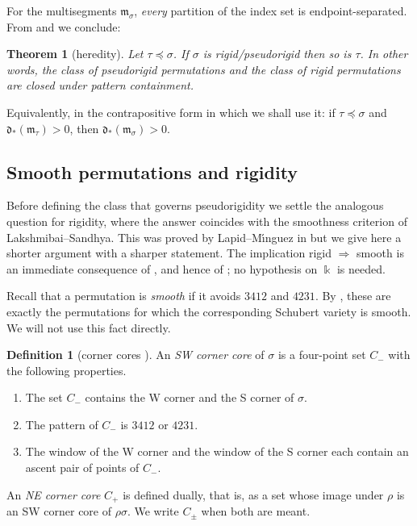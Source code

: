 \documentclass[12pt]{article}
\def\xspace{ }%
\newtheorem{theorem}{Theorem}[section]
\theoremstyle{definition}
\newtheorem{definition}[definition]{Definition}
\newcommand{\prig}{pseudorigid\xspace}
\newcommand{\prigity}{pseudorigidity\xspace}
\newcommand{\smth}{smooth\xspace}
\newcommand{\Smth}{Smooth\xspace}
\newcommand{\mm}{\mathfrak{m}}
\newcommand{\kk}{\Bbbk}
\newcommand{\dfr}{\mathfrak{d}}  %
\newcommand{\rsub}{\sharp}       %
\newcommand{\psub}{\flat}        %
\newcommand{\wo}{w_0}                 %
\newcommand{\rc}{\rho}                %
\newcommand{\Wcr}{W\xspace}    %
\newcommand{\Ncr}{N\xspace}    %
\newcommand{\Scr}{S\xspace}    %
\newcommand{\Ecr}{E\xspace}    %
\newcommand{\SWcr}{SW\xspace}  %
\newcommand{\NEcr}{NE\xspace}  %
\newcommand{\core}{corner core\xspace}
\newcommand{\cores}{corner cores\xspace}
\newcommand{\Cm}{C_{-}}
\newcommand{\Cp}{C_{+}}
\newcommand{\Cpm}{C_{\pm}}
\begin{document}
For the multisegments $\mm_\sigma$, \emph{every} partition of the index set is endpoint-separated.
From  and  we conclude:

\begin{theorem}[heredity]\label{thm:hered}
Let $\tau \preceq \sigma$. If $\sigma$ is rigid/\prig then so is $\tau$.
In other words, the class of \prig permutations and the class of rigid permutations are closed under pattern
containment.
\end{theorem}

Equivalently, in the contrapositive form in which we shall use it: if $\tau
\preceq \sigma$ and $\dfr_\ast(\mm_\tau) > 0$, then
$\dfr_\ast(\mm_\sigma) > 0$.



\subsection{\Smth permutations and rigidity}\label{ssec:smoothrigid}

Before defining the class that governs \prigity we settle the analogous
question for rigidity, where the answer coincides with the smoothness criterion of Lakshmibai--Sandhya.
This was proved by Lapid--M\'{\i}nguez in \cite{MR3866895} but we give here a shorter argument with a sharper statement.
The implication rigid $\Rightarrow$ \smth is an immediate consequence of ,
and hence of ; no hypothesis on $\kk$ is needed.

Recall that a permutation is \emph{\smth} if it avoids $3412$ and $4231$.
By \cite{MR1051089}, these are exactly the permutations for which the corresponding Schubert variety is smooth.
We will not use this fact directly.

\begin{definition}[\cores]\label{def:cores}
An \emph{\SWcr \core} of $\sigma$ is a four-point set $\Cm$ with the
following properties.
\begin{enumerate}
\item\label{core:corners} The set $\Cm$ contains the \Wcr corner and the \Scr
corner of $\sigma$.
\item\label{core:pattern} The pattern of $\Cm$ is $3412$ or $4231$.
\item\label{core:ascent} The window of the \Wcr corner and the window of
the \Scr corner each contain an ascent pair of points of $\Cm$.
\end{enumerate}
An \emph{\NEcr \core} $\Cp$ is defined dually, that is, as a set whose
image under $\rc$ is an \SWcr \core of $\rc\sigma$. We write $\Cpm$
when both are meant.
\end{definition}
\end{document}
